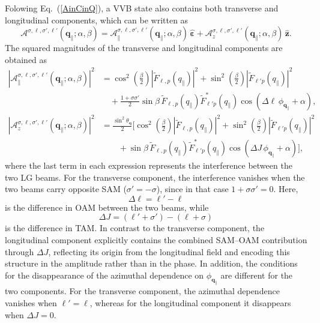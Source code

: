 Folowing Eq.~(\ref{AinCinQ}), a VVB state also contains both transverse and longitudinal components, which can be written as
\begin{equation}
\boldsymbol{\mathcal{A}}^{\sigma, \ell, \sigma', \ell'}(\boldsymbol{q}_\parallel;\alpha,\beta)
=
\boldsymbol{\mathcal{A}}^{\sigma, \ell, \sigma', \ell'}_\parallel(\boldsymbol{q}_\parallel;\alpha,\beta)\,\hat{\boldsymbol{\varepsilon}}
+
\boldsymbol{\mathcal{A}}^{\sigma, \ell, \sigma', \ell'}_z(\boldsymbol{q}_\parallel;\alpha,\beta)\,\hat{\boldsymbol{z}}.
\end{equation}
The squared magnitudes of the transverse and longitudinal components are obtained as
\begin{align}
\left|
\boldsymbol{\mathcal{A}}^{\sigma, \ell, \sigma', \ell'}_\parallel(\boldsymbol{q}_\parallel;\alpha,\beta)
\right|^2
&=
\cos^2\!\left(\frac{\beta}{2}\right)
\left|\tilde{F}_{\ell, p}(q_\parallel)\right|^2
+
\sin^2\!\left(\frac{\beta}{2}\right)
\left|\tilde{F}_{\ell' p}(q_\parallel)\right|^2 \nonumber \\
&\quad+
\frac{1+\sigma\sigma'}{2}\sin\beta\,
\tilde{F}_{\ell, p}(q_\parallel)\tilde{F}^{*}_{\ell' p}(q_\parallel)
\cos\!\left(\Delta\ell\,\phi_{\boldsymbol{q}_\parallel}+\alpha\right),
\label{VVBtrans}
\\[0.4em]
\left|
\boldsymbol{\mathcal{A}}^{\sigma, \ell, \sigma', \ell'}_z(\boldsymbol{q}_\parallel;\alpha,\beta)
\right|^2
&=
\frac{\sin^2\theta_{\boldsymbol{q}}}{2}
\Bigg[
\cos^2\!\left(\frac{\beta}{2}\right)
\left|\tilde{F}_{\ell, p}(q_\parallel)\right|^2
+
\sin^2\!\left(\frac{\beta}{2}\right)
\left|\tilde{F}_{\ell' p}(q_\parallel)\right|^2 \nonumber \\
&\qquad+
\sin\beta\,
\tilde{F}_{\ell, p}(q_\parallel)\tilde{F}^{*}_{\ell' p}(q_\parallel)
\cos\!\left(\Delta J\,\phi_{\boldsymbol{q}_\parallel}+\alpha\right)
\Bigg],
\label{VVBlongi}
\end{align}
where the last term in each expression represents the interference between the two LG beams. For the transverse component, the interference vanishes when the two beams carry opposite SAM ($\sigma'=-\sigma$), since in that case $1+\sigma\sigma'=0$. Here,
\begin{equation}
\Delta \ell=\ell'-\ell
\end{equation}
is the difference in OAM between the two beams, while
\begin{equation}
\Delta J=(\ell'+\sigma')-(\ell+\sigma)
\end{equation}
is the difference in TAM. In contrast to the transverse component, the longitudinal component explicitly contains the combined SAM--OAM contribution through $\Delta J$, reflecting its origin from the longitudinal field and encoding this structure in the amplitude rather than in the phase. In addition, the conditions for the disappearance of the azimuthal dependence on $\phi_{\boldsymbol{q}_\parallel}$ are different for the two components. For the transverse component, the azimuthal dependence vanishes when $\ell'=\ell$, whereas for the longitudinal component it disappears when $\Delta J=0$.

